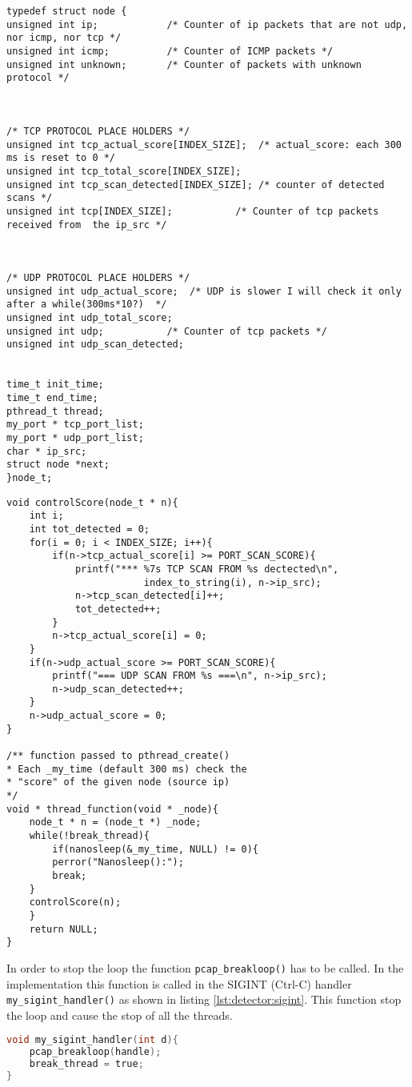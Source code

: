 \begin{lstlisting}[frame=single, caption=Node struct containing the information about the potential attackers]
typedef struct node {
unsigned int ip; 			/* Counter of ip packets that are not udp, nor icmp, nor tcp */
unsigned int icmp; 			/* Counter of ICMP packets */
unsigned int unknown; 		/* Counter of packets with unknown protocol */



/* TCP PROTOCOL PLACE HOLDERS */
unsigned int tcp_actual_score[INDEX_SIZE]; 	/* actual_score: each 300 ms is reset to 0 */
unsigned int tcp_total_score[INDEX_SIZE]; 
unsigned int tcp_scan_detected[INDEX_SIZE]; /* counter of detected scans */
unsigned int tcp[INDEX_SIZE]; 			/* Counter of tcp packets received from  the ip_src */



/* UDP PROTOCOL PLACE HOLDERS */
unsigned int udp_actual_score; 	/* UDP is slower I will check it only after a while(300ms*10?)  */
unsigned int udp_total_score; 
unsigned int udp; 			/* Counter of tcp packets */
unsigned int udp_scan_detected;


time_t init_time;
time_t end_time;
pthread_t thread;
my_port * tcp_port_list;
my_port * udp_port_list;
char * ip_src;
struct node *next;
}node_t;
\end{lstlisting}

\begin{lstlisting}[frame=single]
void controlScore(node_t * n){
	int i;
	int tot_detected = 0;
	for(i = 0; i < INDEX_SIZE; i++){
		if(n->tcp_actual_score[i] >= PORT_SCAN_SCORE){
			printf("*** %7s TCP SCAN FROM %s dectected\n",
						index_to_string(i), n->ip_src);
			n->tcp_scan_detected[i]++;
			tot_detected++;
		}
		n->tcp_actual_score[i] = 0;
	}
	if(n->udp_actual_score >= PORT_SCAN_SCORE){
		printf("=== UDP SCAN FROM %s ===\n", n->ip_src);
		n->udp_scan_detected++;
	}
	n->udp_actual_score = 0;
}

/** function passed to pthread_create() 
* Each _my_time (default 300 ms) check the
* "score" of the given node (source ip)
*/
void * thread_function(void * _node){	
	node_t * n = (node_t *) _node;
	while(!break_thread){
		if(nanosleep(&_my_time, NULL) != 0){
		perror("Nanosleep():");	
		break;
	}
	controlScore(n);
	}
	return NULL;
}
\end{lstlisting}


In order to stop the loop the function \lstinline|pcap_breakloop()| has to be called.
In the implementation this function is called in the SIGINT (Ctrl-C) handler \lstinline|my_sigint_handler()| as shown
in listing \ref{lst:detector:sigint}. This function stop the loop and cause the stop of all the threads.
\begin{lstlisting}[frame=single, language=C, caption=Handler that process the SIGINT signal., label=lst:detector:sigint]
void my_sigint_handler(int d){
	pcap_breakloop(handle);
	break_thread = true;
}
\end{lstlisting}



